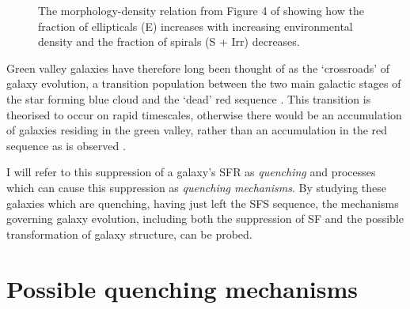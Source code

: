 \begin{figure}[t]
\caption[Morphology Density relation from Figure 4 of \cite{dressler80}]{The morphology-density relation from Figure 4 of \cite{dressler80} showing how the fraction of ellipticals (E) increases with increasing environmental density and the fraction of spirals (S + Irr) decreases.}
\label{fig:dressler}
\end{figure}

Green valley galaxies have therefore long been thought of as the `crossroads' of galaxy evolution, a transition population between the two main galactic stages of the star forming blue cloud and the `dead' red sequence \citep{Bell04, Wyder07, Schim07, Martin07, Faber07, Mendez11, Gonc12, schawinski14, Pan14}. This transition is theorised to occur on rapid timescales, otherwise there would be an accumulation of galaxies residing in the green valley, rather than an accumulation in the red sequence as is observed \citep{Arnouts07, Martin07}.

I will refer to this suppression of a galaxy's SFR as \emph{quenching} and processes which can cause this suppression as \emph{quenching mechanisms}. By studying these galaxies which are quenching, having just left the SFS sequence, the mechanisms governing galaxy evolution, including both the suppression of SF and the possible transformation of galaxy structure, can be probed. 

\section{Possible quenching mechanisms}\label{sec:quenchmech}


